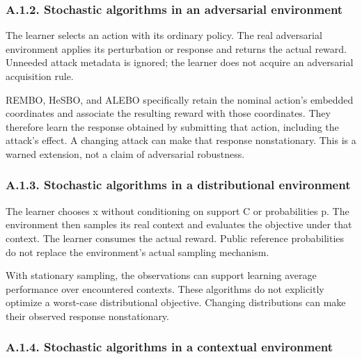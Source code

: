 \documentclass[10pt,a4paper]{article}
\begin{document}
\subsubsection*{A.1.2. Stochastic algorithms in an adversarial environment}

The learner selects an action with its ordinary policy. The real adversarial environment applies its perturbation or response and returns the actual reward. Unneeded attack metadata is ignored; the learner does not acquire an adversarial acquisition rule.


REMBO,\allowbreak{} HeSBO,\allowbreak{} and ALEBO specifically retain the nominal action's embedded coordinates and associate the resulting reward with those coordinates. They therefore learn the response obtained by submitting that action,\allowbreak{} including the attack's effect. A changing attack can make that response nonstationary. This is a warned extension,\allowbreak{} not a claim of adversarial robustness.


\subsubsection*{A.1.3. Stochastic algorithms in a distributional environment}

The learner chooses x without conditioning on support C or probabilities p. The environment then samples its real context and evaluates the objective under that context. The learner consumes the actual reward. Public reference probabilities do not replace the environment's actual sampling mechanism.


With stationary sampling,\allowbreak{} the observations can support learning average performance over encountered contexts. These algorithms do not explicitly optimize a worst-case distributional objective. Changing distributions can make their observed response nonstationary.


\subsubsection*{A.1.4. Stochastic algorithms in a contextual environment}
\end{document}
